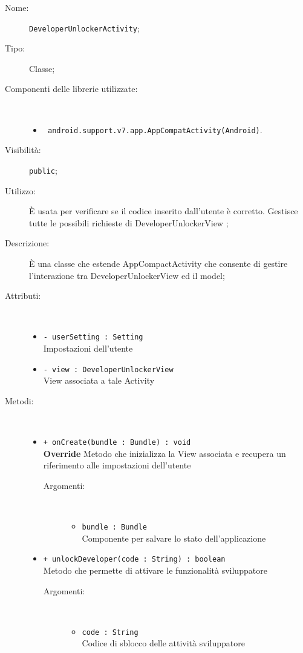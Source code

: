 \documentclass[../DefinizioneDiProdotto.tex]{subfiles}
\begin{document}
    \begin{description}
\item[Nome:] \texttt{DeveloperUnlockerActivity};
\item[Tipo:] Classe;
\item[Componenti delle librerie utilizzate:] \
\begin{itemize}
\item \texttt{ android.support.v7.app.AppCompatActivity(Android)}.

\end{itemize}
\item[Visibilità:] \texttt{public};
\item[Utilizzo:] È usata per verificare se il codice inserito dall'utente è corretto. Gestisce tutte le possibili richieste di DeveloperUnlockerView ;
\item[Descrizione:] È una classe che estende AppCompactActivity che consente di gestire l'interazione tra DeveloperUnlockerView ed il model;
\item[Attributi:] \
\begin{itemize}
\item \texttt{- userSetting : Setting}\\
Impostazioni dell'utente

\item \texttt{- view : DeveloperUnlockerView}\\
View associata a tale Activity

\end{itemize}
\item[Metodi:] \
\begin{itemize}
\item \texttt{+ onCreate(bundle : Bundle) : void}\\
\textbf{Override} Metodo che inizializza la View associata e recupera un riferimento alle impostazioni dell'utente
 \begin{description}
\item[Argomenti:] \
\begin{itemize}
\item \texttt{bundle : Bundle}\\
Componente per salvare lo stato dell'applicazione\end{itemize}
\end{description}
\item \texttt{+ unlockDeveloper(code : String) : boolean}\\
Metodo che permette di attivare le funzionalità sviluppatore
 \begin{description}
\item[Argomenti:] \
\begin{itemize}
\item \texttt{code : String}\\
Codice di sblocco delle attività sviluppatore\end{itemize}
\end{description}
\end{itemize}
\end{description}
\end{document}
